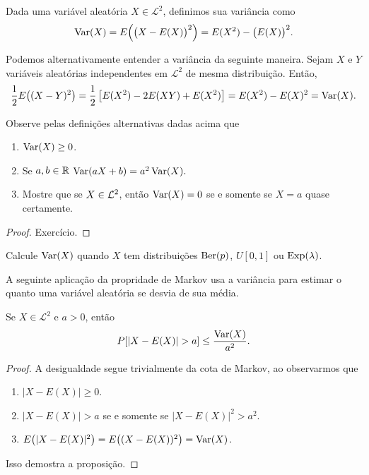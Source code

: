 \begin{definition}
  Dada uma variável aleatória $X \in \mathcal{L}^2$, definimos sua variância  como
  \begin{equation}
    \operatorname{Var}(X) = E \Big( \big(X - E(X)\big)^2 \Big) = E(X^2) - \big( E(X) \big)^2.
  \end{equation}
\end{definition}


Podemos alternativamente entender a variância da seguinte maneira.
Sejam $X$ e $Y$ variáveis aleatórias independentes em $\mathcal{L}^2$ de mesma distribuição.
Então,
\begin{equation}
  \frac{1}{2} E\big( (X - Y)^2 \big) = \frac{1}{2}\left[  E(X^2) - 2 E(XY) + E(X^2)\right] = E(X^2) - E(X)^2 = \operatorname{Var}(X).
\end{equation}


\begin{proposition}
Observe pelas definições alternativas dadas acima que
\begin{enumerate}[\quad a)]
\item $\operatorname{Var}(X) \geq 0$.
\item Se $a, b\in {\ensuremath{\mathbb R}}$ $\operatorname{Var} (aX+b)=a^2 \operatorname{Var}(X).$
\item Mostre que se $X \in {\ensuremath{\mathcal L}}^2$, então $\operatorname{Var}(X) = 0$ se e somente se $X = a$ quase certamente.
\end{enumerate}
\end{proposition}

\begin{proof}
 Exercício.
\end{proof}


\begin{exercise}
  Calcule $\operatorname{Var}(X)$ quando $X$ tem distribuições $\operatorname{Ber}(p)$, $U[0,1]$ ou $\operatorname{Exp}(\lambda)$.
\end{exercise}

A seguinte aplicação da propridade de Markov usa a variância para  estimar o quanto uma variável aleatória se desvia de sua média.
\begin{proposition}
  Se $X \in \mathcal{L}^2$ e $a > 0$, então
  \begin{equation}
    P [ |X - E(X)| > a] \leq \frac{\operatorname{Var}(X)}{a^2}.
  \end{equation}
\end{proposition}

\begin{proof}
  A desigualdade segue trivialmente da cota de Markov, ao observarmos que
  \begin{enumerate}[\quad a)]
  \item $|X - E(X)| \geq 0$.
  \item $|X - E(X)| > a$ se e somente se $|X - E(X)|^2 > a^2$.
  \item $E\big(|X - E(X)|^2\big) = E\big((X - E(X))^2\big) = \operatorname{Var}(X)$.
  \end{enumerate}
  Isso demostra a proposição.
\end{proof}

